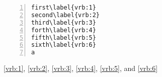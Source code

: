 \documentclass{article}
\begin{document}
\begin{Verbatim}[numbers=left, commandchars=\\\{\}]
first\label{vrb:1}
second\label{vrb:2}
third\label{vrb:3}
forth\label{vrb:4}
fifth\label{vrb:5}
sixth\label{vrb:6}
a\end{Verbatim}

\ref{vrb:1}, \ref{vrb:2}, \ref{vrb:3}, \ref{vrb:4}, \ref{vrb:5}, and \ref{vrb:6}
\newpage\null
\end{document}
